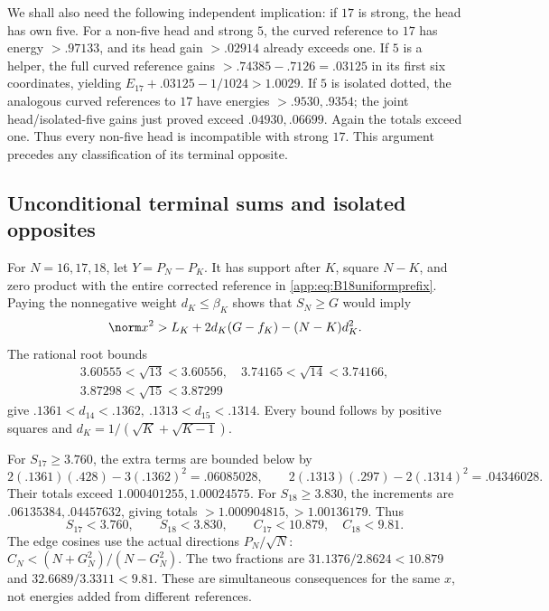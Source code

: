 We shall also need the following independent implication:
if \(17\) is strong, the head has own five.
For a non-five head and strong \(5\), the curved reference to
\(17\) has energy \(>.97133\), and its head gain \(>.02914\)
already exceeds one. If \(5\) is a helper, the full curved
reference gains \(>.74385-.7126=.03125\) in its first six
coordinates, yielding
\(E_{17}+.03125-1/1024>1.0029\).
If \(5\) is isolated dotted, the analogous curved references
to \(17\) have energies \(>.9530,.9354\); the joint
head/isolated-five gains just proved exceed \(.04930,.06699\).
Again the totals exceed one. Thus every non-five head is
incompatible with strong \(17\). This argument precedes any
classification of its terminal opposite.

\subsection{Unconditional terminal sums and isolated opposites}
\label{app:B18sumcutoffs}
For \(N=16,17,18\), let \(Y=P_N-P_K\).
It has support after \(K\), square \(N-K\), and zero product
with the entire corrected reference in
\eqref{app:eq:B18uniformprefix}.
Paying the nonnegative weight \(d_K\leq\beta_K\) shows that
\(S_N\geq G\) would imply
\[
 \norm x^2>L_K+2d_K(G-f_K)-(N-K)d_K^2.
\]
The rational root bounds
\[
\begin{gathered}
3.60555<\sqrt{13}<3.60556,\quad
3.74165<\sqrt{14}<3.74166,\\
3.87298<\sqrt{15}<3.87299
\end{gathered}
\]
give
\(.1361<d_{14}<.1362,\ .1313<d_{15}<.1314\).
Every bound follows by positive squares and
\(d_K=1/(\sqrt K+\sqrt{K-1})\).

For \(S_{17}\geq3.760\), the extra terms are bounded below by
\[
 2(.1361)(.428)-3(.1362)^2=.06085028,\qquad
 2(.1313)(.297)-2(.1314)^2=.04346028.
\]
Their totals exceed \(1.000401255,1.00024575\).
For \(S_{18}\geq3.830\), the increments are
\(.06135384,.04457632\), giving totals
\(>1.000904815,>1.00136179\).
Thus
\begin{equation}\label{app:eq:B18sumbounds}
 S_{17}<3.760,\qquad S_{18}<3.830,\qquad
 C_{17}<10.879,\quad C_{18}<9.81 .
\end{equation}
The edge cosines use the actual directions
\(P_N/\sqrt N\):
\(C_N<(N+G_N^2)/(N-G_N^2)\).
The two fractions are
\(31.1376/2.8624<10.879\) and
\(32.6689/3.3311<9.81\).
These are simultaneous consequences for the same \(x\),
not energies added from different references.

